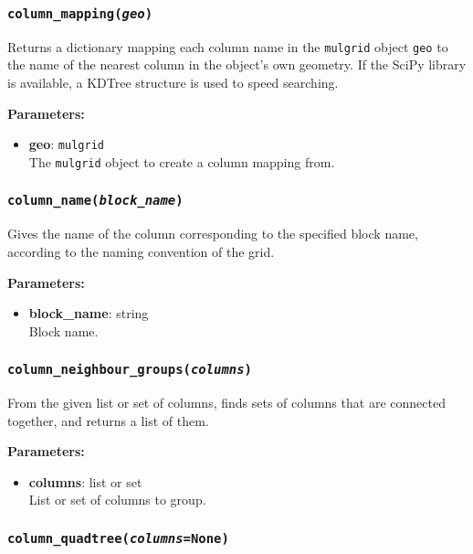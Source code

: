 \subsubsection{\texttt{column\_mapping(\emph{geo})}}

Returns a dictionary mapping each column name in the \texttt{mulgrid} object \texttt{geo} to the name of the nearest column in the object's own geometry.  If the SciPy library is available, a KDTree structure is used to speed searching.

\textbf{Parameters:}
\begin{itemize}
\item \textbf{geo}: \texttt{mulgrid}\\
  The \texttt{mulgrid} object to create a column mapping from.
\end{itemize}

\subsubsection{\texttt{column\_name(\emph{block\_name})}}

Gives the name of the column corresponding to the specified block name, according to the naming convention of the grid.

\textbf{Parameters:}
\begin{itemize}
\item \textbf{block\_name}: string\\
  Block name.
\end{itemize}

\subsubsection{\texttt{column\_neighbour\_groups(\emph{columns})}}

From the given list or set of columns, finds sets of columns that are connected together, and returns a list of them.

\textbf{Parameters:}
\begin{itemize}
\item \textbf{columns}: list or set\\
  List or set of columns to group.
\end{itemize}

\subsubsection{\texttt{column\_quadtree(\emph{columns}=None)}}

